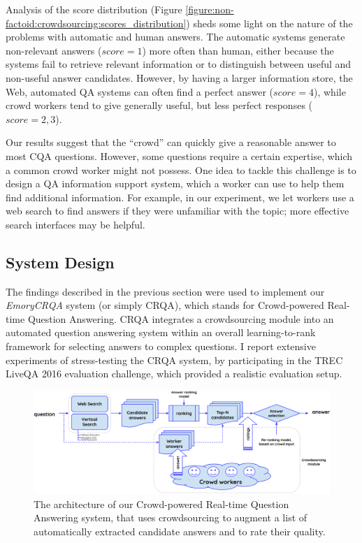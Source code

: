 Analysis of the score distribution (Figure \ref{figure:non-factoid:crowdsourcing:scores_distribution}) sheds some light on the nature of the problems with automatic and human answers.
The automatic systems generate non-relevant answers ($score=1$) more often than human, either because the systems fail to retrieve relevant information or to distinguish between useful and non-useful answer candidates.
However, by having a larger information store, \eg the Web, automated QA systems can often find a perfect answer ($score=4$), while crowd workers tend to give generally useful, but less perfect responses ($score=2,3$).

Our results suggest that the ``crowd'' can quickly give a reasonable answer to most CQA questions. However, some questions require a certain expertise, which a common crowd worker might not possess.
One idea to tackle this challenge is to design a QA information support system, which a worker can use to help them find additional information.
For example, in our experiment, we let workers use a web search to find answers if they were unfamiliar with the topic; more effective search interfaces may be helpful.

\subsection{System Design}
\label{section:crowdsourcing:approach:crqa}

The findings described in the previous section were used to implement our \textit{EmoryCRQA} system (or simply CRQA), which stands for Crowd-powered Real-time Question Answering.
CRQA integrates a crowdsourcing module into an automated question answering system within an overall learning-to-rank framework for selecting answers to complex questions.
I report extensive experiments of stress-testing the CRQA system, by participating in the TREC LiveQA 2016 evaluation challenge, which provided a realistic evaluation setup.

\begin{figure}
    \centering
    \includegraphics[width=\textwidth]{img/crqa_system}
    \caption{The architecture of our Crowd-powered Real-time Question Answering system, that uses crowdsourcing to augment a list of automatically extracted candidate answers and to rate their quality.}
    \label{figure:non-factoid:crowdsourcing:system}
\end{figure}

